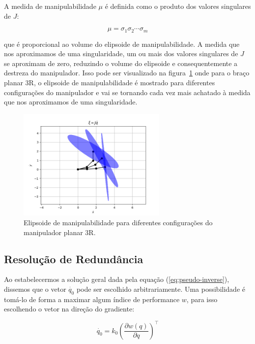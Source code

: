 A medida de manipulabilidade \(\mu\) é definida como o produto dos valores
singulares de \(J\):

\begin{equation}
    \mu = \sigma_1 \sigma_2 \cdots \sigma_m
\end{equation}

que é proporcional ao volume do elipsoide de manipulabilidade. A medida que nos
aproximamos de uma singularidade, um ou mais dos valores singulares de \(J\) se
aproximam de zero, reduzindo o volume do elipsoide e consequentemente a
destreza do manipulador. Isso pode ser visualizado na figura~\ref{fig:manipulability-ellipsoid} onde para o braço
planar 3R, o elipsoide de manipulabilidade é mostrado para diferentes
configurações do manipulador e vai se tornando cada vez mais achatado à medida
que nos aproximamos de uma singularidade.

\begin{figure}
    \centering
    \includegraphics[width=0.65\textwidth]{Images/3r-ellipsoid.png}
    \caption{Elipsoide de manipulabilidade para diferentes configurações do manipulador planar 3R.}\label{fig:manipulability-ellipsoid}
\end{figure}

\subsection{Resolução de Redundância}

Ao estabelecermos a solução geral dada pela equação (\ref{eq:pseudo-inverse}),
dissemos que o vetor \(\dot{q_0}\) pode ser escolhido arbitrariamente. Uma
possibilidade é tomá-lo de forma a maximar algum índice de performance \(w\),
para isso escolhendo o vetor na direção do gradiente:

\begin{equation}
    \dot{q_0} = k_0 {\left( \frac{\partial w(q)}{\partial q} \right)}^\top
\end{equation}

